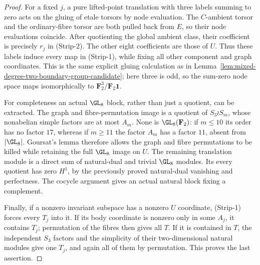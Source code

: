 \begin{proof}
For a fixed $j$, a pure lifted-point translation with three
labels summing to zero acts on the gluing of etale torsors by
node evaluation. The $C$-ambient torsor and the ordinary-fibre
torsor are both pulled back from $E$, so their node evaluations
coincide. After quotienting the global ambient class, their
coefficient is precisely $r_j$ in (Strip-2). The other eight
coefficients are those of $U$. Thus these labels induce every
map in (Strip-1), while fixing all other component and graph
coordinates. This is the same explicit gluing calculation as
in Lemma~\ref{lem:mixed-degree-two-boundary-group-candidate};
here three is odd, so the sum-zero node space maps isomorphically
to $\mathbf F_2^3/\mathbf F_2\mathbf1$.

For completeness an actual $\GL_8$ block, rather than just a
quotient, can be extracted. The graph and fibre-permutation
image is a quotient of $S_3\wr S_m$, whose nonabelian simple
factors are at most $A_m$. None is $\GL_8(\mathbf F_2)$:
if $m\le10$ its order has no factor $17$, whereas if $m\ge11$
the factor $A_m$ has a factor $11$, absent from $|\GL_8|$.
Goursat's lemma therefore allows the graph and fibre permutations
to be killed while retaining the full $\GL_8$ image on $U$.
The remaining translation module is a direct sum of natural-dual
and trivial $\GL_8$ modules. Its every quotient has zero $H^1$,
by the previously proved natural-dual vanishing and perfectness.
The cocycle argument gives an actual natural block fixing a
complement.

Finally, if a nonzero invariant subspace has a nonzero $U$
coordinate, (Strip-1) forces every $T_j$ into it. If its body
coordinate is nonzero only in some $A_j$, it contains $T_j$;
permutation of the fibres then gives all $T$. If it is contained
in $T$, the independent $S_3$ factors and the simplicity of their
two-dimensional natural modules give one $T_j$, and again all
of them by permutation. This proves the last assertion.
\end{proof}


